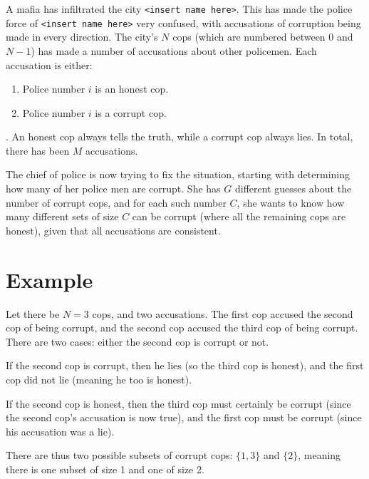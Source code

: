 \newcommand\version{v1}
A mafia has infiltrated the city \texttt{<insert name here>}.
This has made the police force of \texttt{<insert name here>} very confused, with accusations of corruption being made in every direction.
The city's $N$ cops (which are numbered between $0$ and $N - 1$) has made a number of accusations about other policemen.
Each accusation is either:
\begin{enumerate}
  \item Police number $i$ is an honest cop.
  \item Police number $i$ is a corrupt cop.
\end{enumerate}.
An honest cop always tells the truth, while a corrupt cop always lies.
In total, there has been $M$ accusations.

The chief of police is now trying to fix the situation, starting with determining how many
of her police men are corrupt. She has $G$ different guesses about the number of corrupt cops,
and for each such number $C$, she wants to know how many different sets of size $C$ can be corrupt (where all the remaining cops are honest),
given that all accusations are consistent.

\section*{Example}
Let there be $N = 3$ cops, and two accusations.
The first cop accused the second cop of being corrupt, and the second cop accused the third cop of being corrupt.
There are two cases: either the second cop is corrupt or not.

If the second cop is corrupt, then he lies (so the third cop is honest), and the first cop did not lie (meaning he too is honest).

If the second cop is honest, then the third cop must certainly be corrupt (since the second cop's accusation is now true),
and the first cop must be corrupt (since his accusation was a lie).

There are thus two possible subsets of corrupt cops: $\{1, 3\}$ and $\{2\}$, meaning there is one subset of size 1 and one of size 2.

